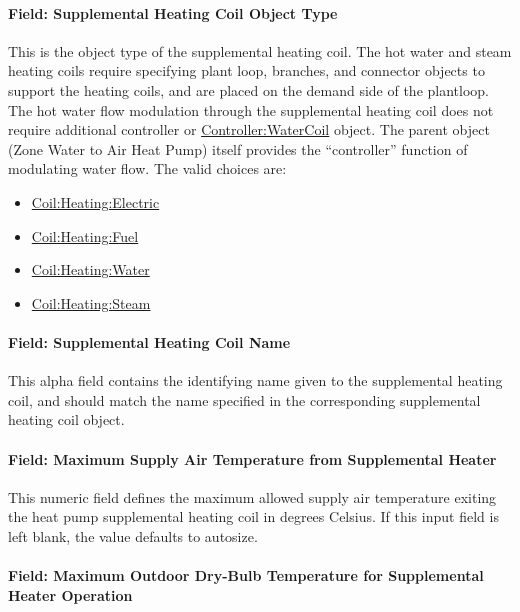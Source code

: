 \paragraph{Field: Supplemental Heating Coil Object Type}\label{field-supplemental-heating-coil-object-type-1-000}

This is the object type of the supplemental heating coil. The hot water and steam heating coils require specifying plant loop, branches, and connector objects to support the heating coils, and are placed on the demand side of the plantloop. The hot water flow modulation through the supplemental heating coil does not require additional controller or \hyperref[controllerwatercoil]{Controller:WaterCoil} object. The parent object (Zone Water to Air Heat Pump) itself provides the ``controller'' function of modulating water flow. The valid choices are:

\begin{itemize}
\item
  \hyperref[coilheatingelectric]{Coil:Heating:Electric}
\item
  \hyperref[coilheatinggas-000]{Coil:Heating:Fuel}
\item
  \hyperref[coilheatingwater]{Coil:Heating:Water}
\item
  \hyperref[coilheatingsteam]{Coil:Heating:Steam}
\end{itemize}

\paragraph{Field: Supplemental Heating Coil Name}\label{field-supplemental-heating-coil-name-1-000}

This alpha field contains the identifying name given to the supplemental heating coil, and should match the name specified in the corresponding supplemental heating coil object.

\paragraph{Field: Maximum Supply Air Temperature from Supplemental Heater}\label{field-maximum-supply-air-temperature-from-supplemental-heater-1-000}

This numeric field defines the maximum allowed supply air temperature exiting the heat pump supplemental heating coil in degrees Celsius. If this input field is left blank, the value defaults to autosize.

\paragraph{Field: Maximum Outdoor Dry-Bulb Temperature for Supplemental Heater Operation}\label{field-maximum-outdoor-dry-bulb-temperature-for-supplemental-heater-operation-1-000}


